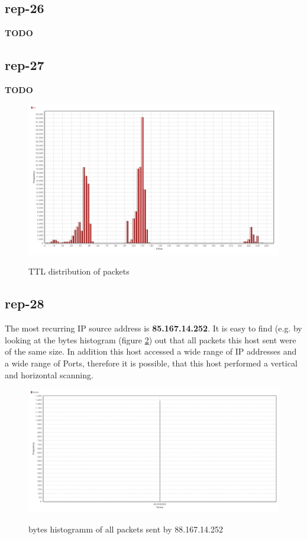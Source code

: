 \subsection*{rep-26}
\textbf{TODO}
\subsection*{rep-27}
\textbf{TODO}
\begin{figure}[H]
\center
\includegraphics[width=1\textwidth]{./chapters/plots/rep-27-ttl}\\
\caption{TTL distribution of packets}
\label{fig:ttl-distribution}
\end{figure}
\subsection*{rep-28}
The most recurring IP source address is \textbf{85.167.14.252}.
It is easy to find (e.g. by looking at the bytes histogram (figure \ref{fig:bytes-histo}) out that all packets this host sent were of the same size. In addition this host accessed a wide range of IP addresses and a wide range of Ports, therefore it is possible, that this host performed a vertical and horizontal scanning.

\begin{figure}[H]
\center
\includegraphics[width=.9\textwidth]{./chapters/plots/rep-28-bytes-histo}\\
\caption{bytes histogramm of all packets sent by 88.167.14.252}
\label{fig:bytes-histo}
\end{figure}

